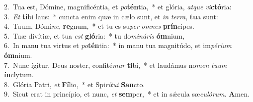 {2.~}Tua est, Dómine, magnificéntia, et \textit{po}\textbf{tén}tia,~* et glória, \textit{at}\textit{que} \textit{vi}\textbf{ctó}ria:\\
{3.~}\textit{Et} \textbf{ti}bi laus:~* cuncta enim quæ in cælo sunt, et \textit{in} \textit{ter}\textit{ra}, \textbf{tu}a sunt:\\
{4.~}Tuum, Dómi\textit{ne}, \textbf{re}gnum,~* et tu es su\textit{per} \textit{om}\textit{nes} \textbf{prín}cipes.\\
{5.~}Tuæ divítiæ, et tua \textit{est} \textbf{gló}ria:~* tu do\textit{mi}\textit{ná}\textit{ris} \textbf{óm}nium,\\
{6.~}In manu tua virtus et \textit{po}\textbf{tén}tia:~* in manu tua magnitúdo, et im\textit{pé}\textit{ri}\textit{um} \textbf{óm}nium.\\
{7.~}Nunc ígitur, Deus noster, confité\textit{mur} \textbf{ti}bi,~* et laudámus no\textit{men} \textit{tu}\textit{um} \textbf{ín}clytum.\\
{8.~}Glória Patri, \textit{et} \textbf{Fí}lio,~* et Spi\textit{rí}\textit{tu}\textit{i} \textbf{San}cto.\\
{9.~}Sicut erat in princípio, et nunc, \textit{et} \textbf{sem}per,~* et in sǽcula sæ\textit{cu}\textit{ló}\textit{rum}. \textbf{A}men.\\
